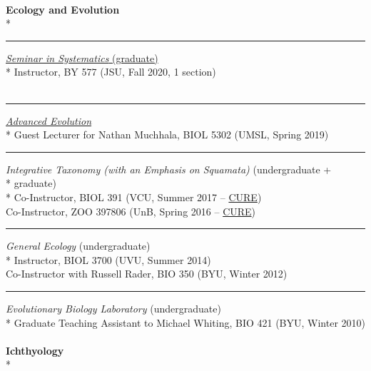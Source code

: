 \documentclass[margin,line]{res}
\begin{document}
\begin{resume}
~\\
\textbf{Ecology and Evolution}\\*
\rule{-1mm}{5mm} \hspace*{4mm} \href{https://catalog.jsu.edu/graduate/science/biology/#coursestext}{\textit{Seminar in Systematics} (graduate)}\\*
\hspace*{8mm} Instructor, BY 577 (JSU, Fall 2020, 1 section)\\
~\\
\rule{-1mm}{5mm} \hspace*{4mm} \href{http://bulletin.umsl.edu/coursesofinstruction/biol/}{\textit{Advanced Evolution}}\\*
\hspace*{8mm} Guest Lecturer for Nathan Muchhala, BIOL 5302 (UMSL, Spring 2019)\\
\rule{-1mm}{5mm} \hspace*{4mm} {\textit{Integrative Taxonomy (with an Emphasis on Squamata)} (undergraduate + }\\*
\hspace*{4.2mm} graduate)\\*
\hspace*{8mm} Co-Instructor, BIOL 391 (VCU, Summer 2017 -- \href{https://sites.nationalacademies.org/cs/groups/dbassesite/documents/webpage/dbasse_177288.pdf}{CURE})\\
\hspace*{8mm} Co-Instructor, ZOO 397806 (UnB, Spring 2016 -- \href{https://sites.nationalacademies.org/cs/groups/dbassesite/documents/webpage/dbasse_177288.pdf}{CURE})\\
\rule{-1mm}{5mm} \hspace*{4mm} {\textit{General Ecology} (undergraduate)}\\*
\hspace*{8mm} Instructor, BIOL 3700 (UVU, Summer 2014)\\
\hspace*{8mm} Co-Instructor with Russell Rader, BIO 350 (BYU, Winter 2012)\\
\rule{-1mm}{5mm} \hspace*{4mm} {\textit{Evolutionary Biology Laboratory} (undergraduate)}\\*
\hspace*{8mm} Graduate Teaching Assistant to Michael Whiting, BIO 421 (BYU, Winter 2010)\\
~\\
\textbf{Ichthyology}\\*

\end{resume}
\end{document}
